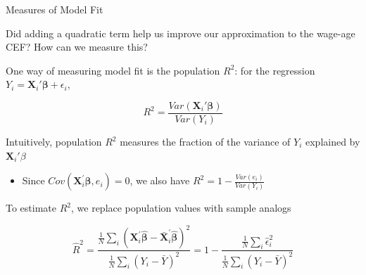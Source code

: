 \documentclass[11pt,english,handout]{beamer}
\newenvironment{wideitemize}{\itemize\addtolength{\itemsep}{10pt}}{\enditemize}
\begin{document}
	\begin{frame}{Measures of Model Fit}
	\begin{wideitemize}
		\item
		Did adding a quadratic term help us improve our approximation to the wage-age CEF? How can we measure this?  
		
		\pause
		\item
		One way of measuring model fit is the population $R^2$: for the regression $Y_i = \bm{X}_i' \bm{\beta} + \epsilon_i$, 
		
		$$ R^2 = \frac{Var(\bm{X}_i' \bm{\beta})}{ Var(Y_i) } $$
		
		\pause
		\item
		Intuitively, population $R^2$ measures the fraction of the variance of $Y_i$ explained by $\bm{X}_i ' \beta$\smallskip
\begin{itemize}
\item Since $Cov(\mathbf{X}_i^\prime\boldsymbol{\beta},e_i)=0$, we also have $R^2=1-\frac{Var(e_i)}{Var(Y_i)}$
\end{itemize}
		
		
		\pause
		\item
		To estimate $R^2$, we replace population values with sample analogs
		
		$$\hat{R}^2 = \frac{\frac{1}{N}\sum_i(\mathbf{X}_i^\prime\hat{\boldsymbol{\beta}}-\bar{\mathbf{X}}_i^\prime\hat{\boldsymbol{\beta}})^2}{\frac{1}{N} \sum_i (Y_i - \bar{Y})^2 }=1 - \dfrac{  \frac{1}{N} \sum_i \hat\epsilon_i^2 }{ \frac{1}{N} \sum_i (Y_i - \bar{Y})^2 }$$
	\end{wideitemize}
\end{frame}
\end{document}
